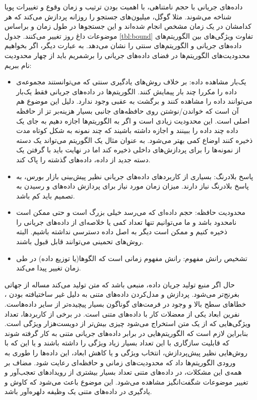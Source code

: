 داده‌های جریانی با حجم نامتناهی، با اهمیت بودن ترتیب و زمان وقوع و تغییرات پویا شناخه می‌شوند. مثلا گوگل، میلیون‌های جستجو را روزانه پردازش می‌کند که هر کدامشان در یک زمان مشخص انجام شده‌اند و این جستجوها در طول زمان و براساس موضوعات داغ روز تغییر می‌کنند. جدول
\ref{tbl:bound}
تفاوت ویژگی‌های بین الگوریتم‌های داده‌های جریانی و الگوریتم‌های سنتی را نشان می‌دهد. به عبارت دیگر، اگر بخواهیم محدودیت‌های الگوریتم‌ها در فضای داده‌های جریانی را برشمریم باید از چهار محدودیت نام ببریم:


\begin{itemize}
\item یک‌بار مشاهده داده: بر خلاف روش‌های یادگیری سنتی که می‌توانستند مجموعه‌‌ی داده را مکررا چند بار پیمایش کنند. الگوریتم‌ها در داده‌های جریانی فقط یک‌بار می‌توانند داده را مشاهده کنند و برگشت به عقبی وجود ندارد. دلیل این موضوع هم آن است که خواندن/نوشتن روی حافظه‌های جانبی بسیار هزینه‌بر تز از حافظه اصلی است. این محدودیت زیادی است و اگر به الگوریتم‌ها اجازه دهیم به جای یک داده چند داده را ببینند و اجازه داشته باشیند که چند نمونه به شکل کوتاه مدت ذخیره کنند اوضاع کمی بهتر می‌شود. به عنوان مثال یک الگوریتم می‌تواند یک دسته از نمونه‌ها را برای پردازش‌های داخلی ذخیره کند اما در نهایت باید با گرفتن یک دسته جدید از داده، داده‌های گذشته را پاک کند. 
\item پاسخ بلادرنگ: بسیاری از کاربردهای داده‌های جریانی نظیر پیش‌بینی بازار بورس، به پاسخ بلادرنگ نیاز دارند. میزان زمان مورد نیاز برای پردازش داده‌های و رسیدن به تصمیم باید کم باشد.
\item محدودیت حافظه: حجم‌ داده‌ای که می‌رسد خیلی بزرگ است و حتی ممکن است نامحدود باشد و ما می‌توانیم تنها تعداد کمی یا خلاصه‌ای از داده‌های جریانی را ذخیره‌ کنیم و ممکن است دیگر به اصل داده دسترسی نداشته باشیم. البته روش‌های تحمینی می‌توانند قابل قبول باشند.
\item تشخیص رانش‌ مفهوم: رانش‌ مفهوم زمانی است که الگوها(یا توزیع داده) در طی زمان تغییر پیدا می‌کند.
\end{itemize}

حال اگر منبع تولید جریان داده، منبعی باشد که متن تولید می‌کند مساله از جهاتی بغرنج‌تر می‌شود. پردازش و مدل‌کردن داده‌های متنی به دلیل غیر ساختیافته‌ بودن
، خطاهای سطح بالا
و وجود در فرمت‌های گوناگون بسیار پیچیده‌تر از سایر داده‌هاست. نفرین ابعاد
یکی از معضلات کار با داده‌های متنی است. در برخی از کاربردها، تعداد ویژگی‌هایی که از یک متن استخراج می‌شود چیزی بیش‌تر از دویست‌هزار ویژگی است. بنابراین لازم است که الگوریتم‌هایی در برابر داده‌های جریانی متنی به کار گرفته شوند که قابلیت سازگاری با این تعداد بسیار زیاد ویژگی را داشته باشند و یا این که با روش‌هایی نظیر پیش‌پردازش، انتخاب ویژگی و یا کاهش ابعاد، این داده‌ها را طوری به ورودی الگوریتم‌ها داد که محدودیت‌های زمانی و حافظه‌ای رعایت شود.
مضاف بر همه‌ی این مشکلات، در داده‌های متنی تعداد بسیار بیشتری از رویداد‌های تعجب‌آور و تغییر موضوعات شگفت‌انگیز مشاهده می‌شود. این موضوع باعث می‌شود که کاوش و یادگیری در داده‌های متنی یک وظیفه دلهره‌آور باشد. 








